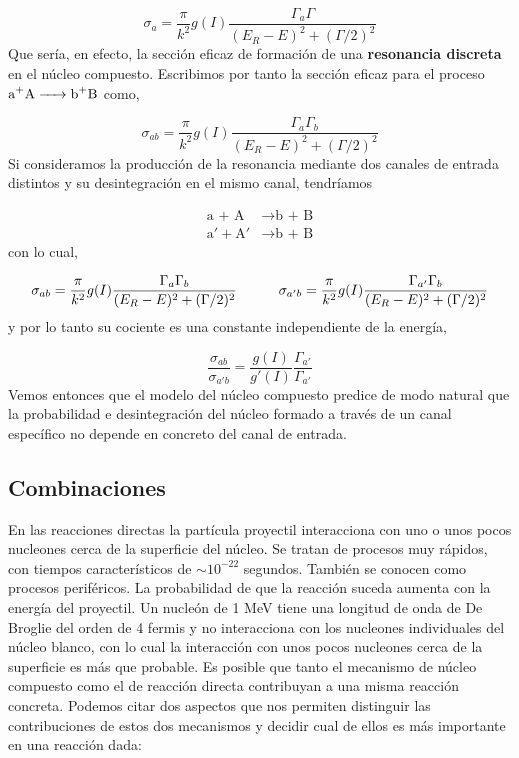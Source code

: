 \begin{equation}
	\sigma_a = \frac{\pi}{k^2} g(I) \frac{\Gamma_a \Gamma}{(E_R-E)^2 + (\Gamma /2)^2}
\end{equation}
Que sería, en efecto, la sección eficaz de formación de una \textbf{resonancia discreta} en el núcleo compuesto. Escribimos por tanto la sección eficaz para el proceso $\ce{a+A -> b+B}$ como,

\begin{equation}
	\sigma_{ab} = \frac{\pi}{k^2} g(I) \frac{\Gamma_a  \Gamma_b}{(E_R-E)^2 + (\Gamma/2)^2}
\end{equation}
Si consideramos la producción de la resonancia mediante dos canales de entrada distintos y su desintegración en el mismo canal, tendríamos 


\begin{equation}
\begin{split}
	\text{a + A} & \rightarrow  \text{b + B} \\
	\text{a}' + \text{A}' & \rightarrow \text{b + B}
\end{split}
\end{equation}
con lo cual, 

\begin{equation}
	\sigma_{ab} = \frac{\pi}{k^2} g(I) \frac{\Gamma_a \Gamma_b}{ (E_R-E)^2 + (\Gamma /2 )^2} \quad \quad \quad \sigma_{a 'b} = \frac{\pi}{k^2} g(I) \frac{ \Gamma_{a'} \Gamma_b}{(E_R-E)^2 + (\Gamma /2 )^2}
\end{equation}
y por lo tanto su cociente es una constante independiente de la energía,

\begin{equation}
	\frac{\sigma_{ab}}{\sigma_{a'b}} = \frac{g(I)}{g'(I)} \frac{\Gamma_{a'}}{\Gamma_{a'}}
\end{equation}
Vemos entonces que el modelo del núcleo compuesto predice de modo natural que la probabilidad e desintegración del núcleo formado a través de un canal específico no depende en concreto del canal de entrada.

\subsection{Combinaciones}

En las reacciones directas la partícula proyectil interacciona con uno o unos pocos nucleones cerca de la superficie del núcleo. Se tratan de procesos muy rápidos, con tiempos característicos de $\sim 10^{-22}$ segundos. También se conocen como procesos periféricos. La probabilidad de que la reacción suceda aumenta con la energía del proyectil. Un nucleón de 1 MeV tiene una longitud de onda de De Broglie del orden de 4 fermis y no interacciona con los nucleones individuales del núcleo blanco, con lo cual la interacción con unos pocos nucleones cerca de la superficie es más que probable. Es posible que tanto el mecanismo de núcleo compuesto como el de reacción directa contribuyan a una misma reacción concreta. Podemos citar dos aspectos que nos permiten distinguir las contribuciones de estos dos mecanismos y decidir cual de ellos es más importante en una reacción dada:

